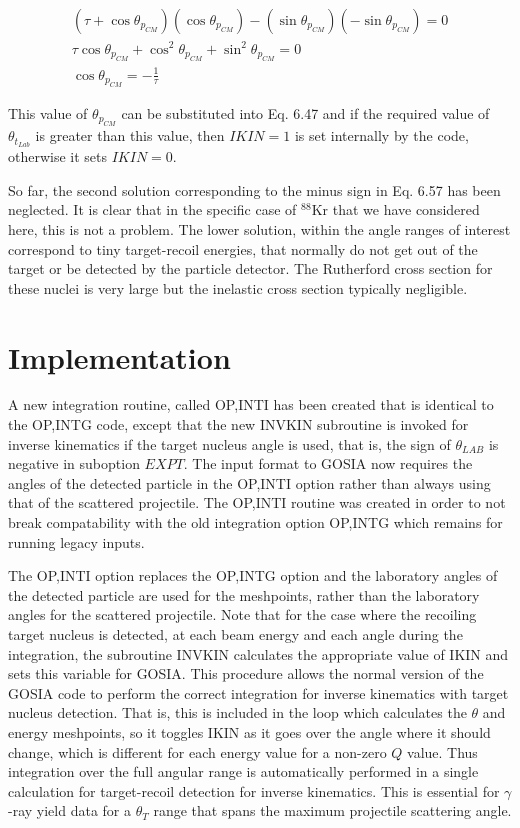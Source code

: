 \documentclass[10pt]{article}
\begin{document}
\begin{gather*}
\left(\tau+\cos \theta_{p_{C M}}\right)\left(\cos \theta_{p_{C M}}\right)-\left(\sin \theta_{p_{C M}}\right)\left(-\sin \theta_{p_{C M}}\right)=0  \tag{6.62}\\
\tau \cos \theta_{p_{C M}}+\cos ^{2} \theta_{p_{C M}}+\sin ^{2} \theta_{p_{C M}}=0  \tag{6.63}\\
\cos \theta_{p_{C M}}=-\frac{1}{\tau} \tag{6.64}
\end{gather*}


This value of $\theta_{p_{C M}}$ can be substituted into Eq. 6.47 and if the required value of $\theta_{t_{L a b}}$ is greater than this value, then $I K I N=1$ is set internally by the code, otherwise it sets $I K I N=0$.

So far, the second solution corresponding to the minus sign in Eq. 6.57 has been neglected. It is clear that in the specific case of ${ }^{88} \mathrm{Kr}$ that we have considered here, this is not a problem. The lower solution, within the angle ranges of interest correspond to tiny target-recoil energies, that normally do not get out of the target or be detected by the particle detector. The Rutherford cross section for these nuclei is very large but the inelastic cross section typically negligible.

\section*{Implementation}
A new integration routine, called OP,INTI has been created that is identical to the OP,INTG code, except that the new INVKIN subroutine is invoked for inverse kinematics if the target nucleus angle is used, that is, the sign of $\theta_{L A B}$ is negative in suboption $E X P T$. The input format to GOSIA now requires the angles of the detected particle in the OP,INTI option rather than always using that of the scattered projectile. The OP,INTI routine was created in order to not break compatability with the old integration option OP,INTG which remains for running legacy inputs.

The OP,INTI option replaces the OP,INTG option and the laboratory angles of the detected particle are used for the meshpoints, rather than the laboratory angles for the scattered projectile. Note that for the case where the recoiling target nucleus is detected, at each beam energy and each angle during the integration, the subroutine INVKIN calculates the appropriate value of IKIN and sets this variable for GOSIA. This procedure allows the normal version of the GOSIA code to perform the correct integration for inverse kinematics with target nucleus detection. That is, this is included in the loop which calculates the $\theta$ and energy meshpoints, so it toggles IKIN as it goes over the angle where it should change, which is different for each energy value for a non-zero $Q$ value. Thus integration over the full angular range is automatically performed in a single calculation for target-recoil detection for inverse kinematics. This is essential for $\gamma$-ray yield data for a $\theta_{T}$ range that spans the maximum projectile scattering angle.
\end{document}
